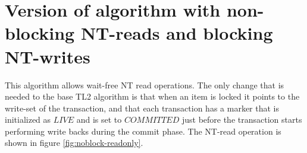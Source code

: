\documentclass[11pt,letterpaper]{article}
\begin{document}
\section{Version of algorithm with non-blocking NT-reads and blocking NT-writes}

This algorithm allows wait-free NT read operations.
The only change that is needed to the base TL2 algorithm is that when an item is locked it points to the write-set of the transaction, and that each
transaction has a marker that is initialized as $\mathit{LIVE}$ and is set to $\mathit{COMMITTED}$ just before the transaction starts performing write backs during the commit phase.
The NT-read operation is shown in figure \ref{fig:noblock-readonly}.
\end{document}
